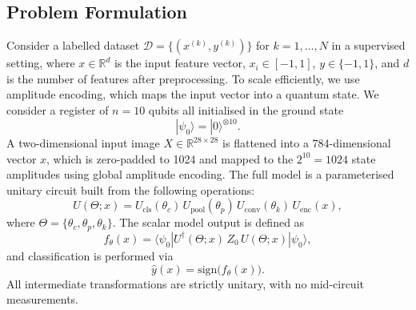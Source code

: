 \documentclass[conference]{IEEEtran}
\begin{document}
\subsection{Problem Formulation}
Consider a labelled dataset $\mathcal{D} = \{(x^{(k)}, y^{(k)})\}$ for $k = 1, \ldots, N$ in a supervised setting, where $x \in \mathbb{R}^d$ is the input feature vector, $x_i \in [-1, 1]$, $y \in \{-1, 1\}$, and $d$ is the number of features after preprocessing. To scale efficiently, we use amplitude encoding, which maps the input vector into a quantum state. We consider a register of $n = 10$ qubits all initialised in the ground state
\begin{equation}
|\psi_0\rangle = |0\rangle^{\otimes 10}.
\end{equation}
A two-dimensional input image $X \in \mathbb{R}^{28 \times 28}$ is flattened into a 784-dimensional vector $x$, which is zero-padded to 1024 and mapped to the $2^{10} = 1024$ state amplitudes using global amplitude encoding. The full model is a parameterised unitary circuit built from the following operations:
\begin{equation}
U(\Theta; x) = U_{\text{cls}}(\theta_c)\, U_{\text{pool}}(\theta_p)\, U_{\text{conv}}(\theta_k)\, U_{\text{enc}}(x),
\end{equation}
where $\Theta = \{\theta_c, \theta_p, \theta_k\}$. The scalar model output is defined as
\begin{equation}
f_\theta(x) = \langle\psi_0|U^\dagger(\Theta; x)\, Z_0\, U(\Theta; x)|\psi_0\rangle,
\end{equation}
and classification is performed via
\begin{equation}
\hat{y}(x) = \text{sign}\big(f_\theta(x)\big).
\end{equation}
All intermediate transformations are strictly unitary, with no mid-circuit measurements.
\end{document}
